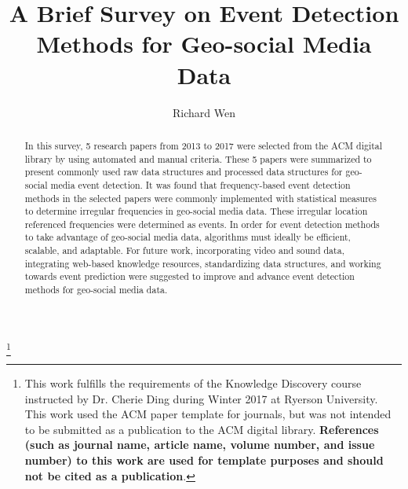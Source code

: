 \documentclass[acmsmall]{acmart}
\begin{document}
\title{A Brief Survey on Event Detection Methods for Geo-social Media Data}
\author{Richard Wen}

\begin{abstract}
In this survey, 5 research papers from 2013 to 2017 were selected from the ACM digital library by using automated and manual criteria. These 5 papers were summarized to present commonly used raw data structures and processed data structures for geo-social media event detection. It was found that frequency-based event detection methods in the selected papers were commonly implemented with statistical measures to determine irregular frequencies in geo-social media data. These irregular location referenced frequencies were determined as events. In order for event detection methods to take advantage of geo-social media data, algorithms must ideally be efficient, scalable, and adaptable. For future work, incorporating video and sound data, integrating web-based knowledge resources, standardizing data structures, and working towards event prediction were suggested to improve and advance event detection methods for geo-social media data.
\end{abstract}


\thanks{
This work fulfills the requirements of the Knowledge Discovery course instructed by Dr. Cherie Ding during Winter 2017 at Ryerson University. This work used the ACM paper template for journals, but was not intended to be submitted as a publication to the ACM digital library. \textbf{References (such as journal name, article name, volume number, and issue number) to this work are used for template purposes and should not be cited as a publication}.
}


\maketitle


\end{document}
